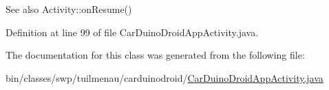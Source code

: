 \begin{DoxySeeAlso}{See also}
Activity\+::on\+Resume() 
\end{DoxySeeAlso}


Definition at line 99 of file Car\+Duino\+Droid\+App\+Activity.\+java.



The documentation for this class was generated from the following file\+:\begin{DoxyCompactItemize}
\item 
bin/classes/swp/tuilmenau/carduinodroid/\hyperlink{bin_2classes_2swp_2tuilmenau_2carduinodroid_2_car_duino_droid_app_activity_8java}{Car\+Duino\+Droid\+App\+Activity.\+java}\end{DoxyCompactItemize}
